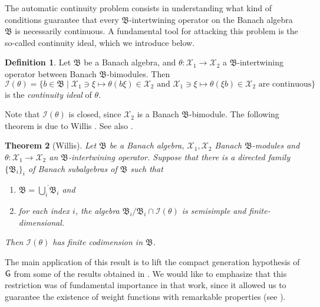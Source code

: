 \documentclass[11pt]{article}
\newcommand{\B}{\mathfrak{B}}
\def\X{\mathcal{X}}
\def\G{{\sf G}}
\newtheorem{thm}{Theorem}[section]
\theoremstyle{definition}
\newtheorem{defn}[thm]{Definition}
\theoremstyle{remark}
\numberwithin{equation}{section}
\numberwithin{equation}{section}
\begin{document}
The automatic continuity problem consists in understanding what kind of conditions guarantee that every $\B$-intertwining operator on the Banach algebra $\B$ is necessarily continuous. A fundamental tool for attacking this problem is the so-called continuity ideal, which we introduce below.


\begin{defn}
    Let $\B$ be a Banach algebra, and $\theta:\X_1\to\X_2$ a $\B$-intertwining operator between Banach $\B$-bimodules. Then $$\mathscr I(\theta)=\{b\in\B\mid \X_1\ni \xi\mapsto \theta(b\xi)\in \X_2 \text{ and }\X_1\ni \xi\mapsto \theta(\xi b)\in \X_2\text{ are continuous}\}$$ is the \emph{continuity ideal} of $\theta$.
\end{defn}

Note that $\mathscr I(\theta)$ is closed, since $\X_2$ is a Banach $\B$-bimodule. The following theorem is due to Willis \cite[Lemma 4.3.5]{Wi80}. See also \cite[pag. 498]{Ru96}.
\begin{thm}[Willis]\label{WILLIS}
    Let $\B$ be a Banach algebra, $\X_1,\X_2$ Banach $\B$-modules and $\theta:\X_1\to\X_2$ an $\B$-intertwining operator. Suppose that there is a directed family $\{\B_i\}_i$ of Banach subalgebras of $\B$ such that \begin{enumerate}
        \item $\B=\overline{\bigcup_i \B_i}$ and
        \item for each index $i$, the algebra $\B_i/\B_i\cap \mathscr I(\theta)$ is semisimple and finite-dimensional.
    \end{enumerate} Then $\mathscr I(\theta)$ has finite codimension in $\B$.
\end{thm}

The main application of this result is to lift the compact generation hypothesis of $\G$ from some of the results obtained in \cite{flores2024}. We would like to emphasize that this restriction was of fundamental importance in that work, since it allowed us to guarantee the existence of weight functions with remarkable properties (see \cite[Lemma 3.4]{flores2024}).
\end{document}
